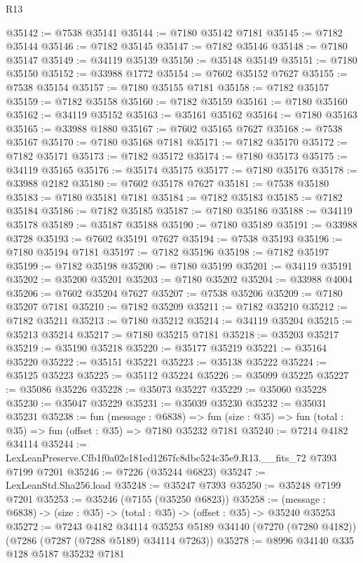 \begin{lexlean}{R13}
\begin{coremodule}
@35142 := @7538 @35141
@35144 := @7180 @35142 @7181
@35145 := @7182 @35144
@35146 := @7182 @35145
@35147 := @7182 @35146
@35148 := @7180 @35147
@35149 := @34119 @35139
@35150 := @35148 @35149
@35151 := @7180 @35150
@35152 := @33988 @1772
@35154 := @7602 @35152 @7627
@35155 := @7538 @35154
@35157 := @7180 @35155 @7181
@35158 := @7182 @35157
@35159 := @7182 @35158
@35160 := @7182 @35159
@35161 := @7180 @35160
@35162 := @34119 @35152
@35163 := @35161 @35162
@35164 := @7180 @35163
@35165 := @33988 @1880
@35167 := @7602 @35165 @7627
@35168 := @7538 @35167
@35170 := @7180 @35168 @7181
@35171 := @7182 @35170
@35172 := @7182 @35171
@35173 := @7182 @35172
@35174 := @7180 @35173
@35175 := @34119 @35165
@35176 := @35174 @35175
@35177 := @7180 @35176
@35178 := @33988 @2182
@35180 := @7602 @35178 @7627
@35181 := @7538 @35180
@35183 := @7180 @35181 @7181
@35184 := @7182 @35183
@35185 := @7182 @35184
@35186 := @7182 @35185
@35187 := @7180 @35186
@35188 := @34119 @35178
@35189 := @35187 @35188
@35190 := @7180 @35189
@35191 := @33988 @3728
@35193 := @7602 @35191 @7627
@35194 := @7538 @35193
@35196 := @7180 @35194 @7181
@35197 := @7182 @35196
@35198 := @7182 @35197
@35199 := @7182 @35198
@35200 := @7180 @35199
@35201 := @34119 @35191
@35202 := @35200 @35201
@35203 := @7180 @35202
@35204 := @33988 @4004
@35206 := @7602 @35204 @7627
@35207 := @7538 @35206
@35209 := @7180 @35207 @7181
@35210 := @7182 @35209
@35211 := @7182 @35210
@35212 := @7182 @35211
@35213 := @7180 @35212
@35214 := @34119 @35204
@35215 := @35213 @35214
@35217 := @7180 @35215 @7181
@35218 := @35203 @35217
@35219 := @35190 @35218
@35220 := @35177 @35219
@35221 := @35164 @35220
@35222 := @35151 @35221
@35223 := @35138 @35222
@35224 := @35125 @35223
@35225 := @35112 @35224
@35226 := @35099 @35225
@35227 := @35086 @35226
@35228 := @35073 @35227
@35229 := @35060 @35228
@35230 := @35047 @35229
@35231 := @35039 @35230
@35232 := @35031 @35231
@35238 := fun (message : @6838) =>
  fun (size : @35) => fun (total : @35) => fun (offset : @35) => @7180 @35232 @7181
@35240 := @7214 @4182 @34114
@35244 := LexLeanPreserve.Cfb1f0a02e181ed1267fc8dbc524c35e9.R13.__fits_72 @7393 @7199 @7201
@35246 := @7226 (@35244 @6823)
@35247 := LexLeanStd.Sha256.load
@35248 := @35247 @7393
@35250 := @35248 @7199 @7201
@35253 := @35246 (@7155 (@35250 @6823))
@35258 := (message : @6838) -> (size : @35) -> (total : @35) -> (offset : @35) -> @35240 @35253
@35272 := @7243
    @4182
    @34114
    @35253
    @5189
    @34140
    (@7270 (@7280 @4182))
    (@7286 (@7287 (@7288 @5189) @34114 @7263))
@35278 := @8996 @34140 @335 @128 @5187 @35232 @7181

\end{coremodule}
\end{lexlean}
